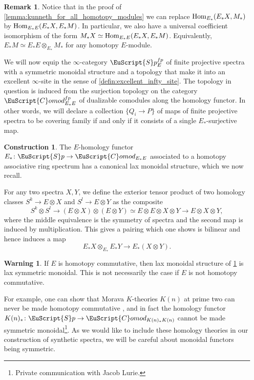 \documentclass[oneside,a4paper]{amsart}
\newcommand{\euscr}[1]{\EuScript{#1}} %
\newcommand{\Hom}{\textnormal{Hom}} %
\newcommand{\spectra}{\euscr{S}p} %
\newcommand{\Comod}{\euscr{C}omod} %
\newcommand{\ComodE}{\Comod_{E_{*}E}} %
\theoremstyle{plain}
\theoremstyle{definition}
\newtheorem{warning}[thm]{Warning}
\newtheorem{rem}[thm]{Remark}
\newtheorem{construction}[thm]{Construction}
\theoremstyle{remark}
\begin{document}
\begin{rem}
\label{rem:kunneth_iso_also_holds_in_comodule_form}
Notice that in the proof of \cref{lemma:kunneth_for_all_homotopy_modules} we can replace $\Hom_{E_{*}}(E_{*}X, M_{*})$ by $\Hom_{E_{*}E}(E_{*}X, E_{*}M)$. In particular, we also have a universal coefficient isomorphism of the form $M_{*}X \simeq \Hom_{E_{*}E}(E_{*}X, E_{*}M)$. Equivalently, $E_{*}M \simeq E_{*}E \otimes_{E_{*}} M_{*}$ for any homotopy $E$-module.
\end{rem}

We will now equip the $\infty$-category $\spectra_{E}^{fp}$ of finite projective spectra with a symmetric monoidal structure and a topology that make it into an excellent $\infty$-site in the sense of \cref{defin:excellent_infty_site}. The topology in question is induced from the surjection topology on the category $\ComodE^{fp}$ of dualizable comodules along the homology functor. In other words, we will declare a collection $\{ Q_{i} \rightarrow P \}$ of maps of finite projective spectra to be covering family if and only if it consists of a single $E_{*}$-surjective map. 

\begin{construction}
\label{construction:homology_is_lax_monoidal}
The $E$-homology functor $E_{*} \colon \spectra \rightarrow \ComodE$ associated to a homotopy associative ring spectrum has a canonical lax monoidal structure, which we now recall.

For any two spectra $X, Y$, we define the exterior tensor product of two homology classes $S^{k} \rightarrow E \otimes X$ and $S^{l} \rightarrow E \otimes Y$ as the composite 
\[
S^{k} \otimes S^{l} \rightarrow (E \otimes X) \otimes (E \otimes Y) \simeq E \otimes E \otimes X \otimes Y \rightarrow E \otimes X \otimes Y,
\]
where the middle equivalence is the symmetry of spectra and the second map is induced by multiplication. This gives a pairing which one shows is bilinear and hence induces a map
\[
E_{*}X \otimes_{E_{*}} E_{*}Y \rightarrow E_{*}(X \otimes Y).
\]
\end{construction}

\begin{warning}
\label{warning:homology_not_necessarily_homotopy_commutative}
If $E$ is homotopy commutative, then lax monoidal structure of \cref{construction:homology_is_lax_monoidal} is lax symmetric monoidal. This is not necessarily the case if $E$ is not homotopy commutative. 

For example, one can show that Morava $K$-theories $K(n)$ at prime two can never be made homotopy commutative \cite{wurgler1991morava}, and in fact the homology functor $K(n)_{*} \colon \spectra \rightarrow \Comod_{K(n)_{*}K(n)}$ cannot be made symmetric monoidal\footnote{Private communication with Jacob Lurie.}. As we would like to include these homology theories in our construction of synthetic spectra, we will be careful about monoidal functors being symmetric. 
\end{warning}
\end{document}
